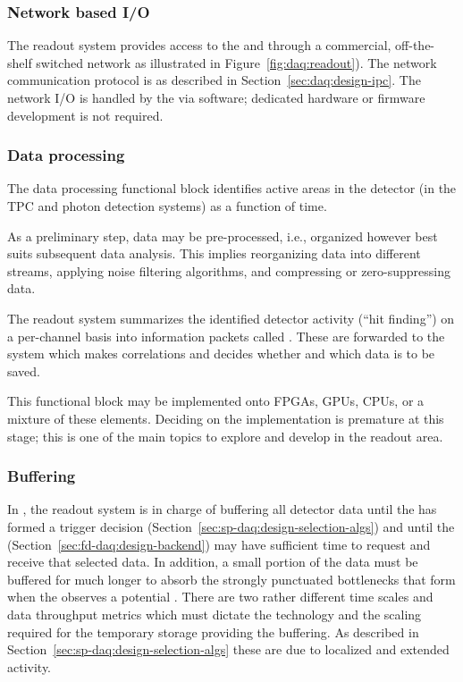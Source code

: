 \subsubsection{Network based I/O}

The readout system provides access to the  and  through a commercial, off-the-shelf switched network as illustrated in Figure~\ref{fig:daq:readout}).
The network communication protocol is as described in Section~\ref{sec:daq:design-ipc}.
The network I/O is handled by the  via software; dedicated hardware or firmware development is not required.

\subsubsection{Data processing}

The data processing functional block identifies active areas in the detector (in the TPC and photon detection systems) as a function of time.

As a preliminary step, data may be pre-processed, i.e., organized however best suits subsequent data analysis. This implies reorganizing data into different streams, applying noise filtering algorithms, and compressing or zero-suppressing data.

The readout system summarizes the identified detector activity (``hit finding'') on a per-channel basis into information packets called .  These are forwarded to the  system which makes correlations and decides whether and which data is to be saved.

This functional block may be implemented onto FPGAs, GPUs, CPUs, or a mixture of these elements.
Deciding on the implementation is premature at this stage; this is one of the main topics to explore and develop in the readout area.

\subsubsection{Buffering}

In , the readout system is in charge of buffering all detector data until the  has formed a trigger decision (Section~\ref{sec:sp-daq:design-selection-algs}) and until the  (Section~\ref{sec:fd-daq:design-backend}) may have sufficient time to request and receive that selected data. 
In addition, a small portion of the data must be buffered for much longer to absorb the strongly punctuated bottlenecks that form when the  observes a potential .
There are two rather different time scales and data throughput metrics which must dictate the technology and the scaling required for the temporary storage providing the buffering.
As described in Section~\ref{sec:sp-daq:design-selection-algs} these are due to localized and extended activity.

